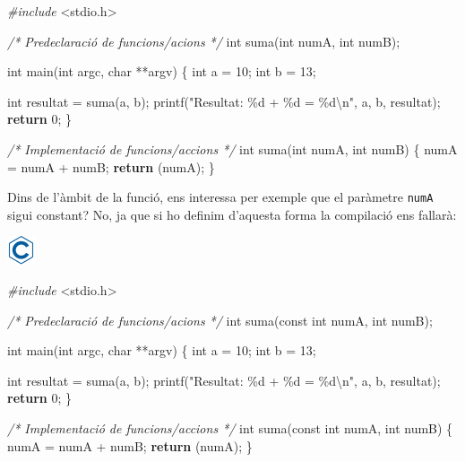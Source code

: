 \documentclass[]{book}
\newenvironment{Shaded}{\begin{snugshade}}{\end{snugshade}}
\newcommand{\CommentTok}[1]{\textcolor[rgb]{0.56,0.35,0.01}{\textit{#1}}}
\newcommand{\ControlFlowTok}[1]{\textcolor[rgb]{0.13,0.29,0.53}{\textbf{#1}}}
\newcommand{\DataTypeTok}[1]{\textcolor[rgb]{0.13,0.29,0.53}{#1}}
\newcommand{\DecValTok}[1]{\textcolor[rgb]{0.00,0.00,0.81}{#1}}
\newcommand{\ImportTok}[1]{#1}
\newcommand{\NormalTok}[1]{#1}
\newcommand{\PreprocessorTok}[1]{\textcolor[rgb]{0.56,0.35,0.01}{\textit{#1}}}
\newcommand{\SpecialCharTok}[1]{\textcolor[rgb]{0.00,0.00,0.00}{#1}}
\newcommand{\StringTok}[1]{\textcolor[rgb]{0.31,0.60,0.02}{#1}}
\begin{document}
\begin{Shaded}
\begin{Highlighting}[]
\PreprocessorTok{\#include }\ImportTok{\textless{}stdio.h\textgreater{}}

\CommentTok{/* Predeclaració de funcions/acions */}
\DataTypeTok{int}\NormalTok{ suma(}\DataTypeTok{int}\NormalTok{ numA, }\DataTypeTok{int}\NormalTok{ numB);}

\DataTypeTok{int}\NormalTok{ main(}\DataTypeTok{int}\NormalTok{ argc, }\DataTypeTok{char}\NormalTok{ **argv) \{}
    \DataTypeTok{int}\NormalTok{ a = }\DecValTok{10}\NormalTok{;}
    \DataTypeTok{int}\NormalTok{ b = }\DecValTok{13}\NormalTok{;}

    \DataTypeTok{int}\NormalTok{ resultat = suma(a, b);}
\NormalTok{    printf(}\StringTok{"Resultat: \%d + \%d = \%d}\SpecialCharTok{\textbackslash{}n}\StringTok{"}\NormalTok{, a, b, resultat);}
    \ControlFlowTok{return} \DecValTok{0}\NormalTok{;}
\NormalTok{\}}

\CommentTok{/* Implementació de funcions/accions */}
\DataTypeTok{int}\NormalTok{ suma(}\DataTypeTok{int}\NormalTok{ numA, }\DataTypeTok{int}\NormalTok{ numB) \{}
\NormalTok{    numA = numA + numB;}
    \ControlFlowTok{return}\NormalTok{ (numA);}
\NormalTok{\}}
\end{Highlighting}
\end{Shaded}

Dins de l'àmbit de la funció, ens interessa per exemple que el paràmetre \texttt{numA} sigui constant? No, ja que si ho definim d'aquesta forma la compilació ens fallarà:

\includegraphics{./img/c.png}

\begin{Shaded}
\begin{Highlighting}[]
\PreprocessorTok{\#include }\ImportTok{\textless{}stdio.h\textgreater{}}

\CommentTok{/* Predeclaració de funcions/acions */}
\DataTypeTok{int}\NormalTok{ suma(}\DataTypeTok{const} \DataTypeTok{int}\NormalTok{ numA, }\DataTypeTok{int}\NormalTok{ numB);}

\DataTypeTok{int}\NormalTok{ main(}\DataTypeTok{int}\NormalTok{ argc, }\DataTypeTok{char}\NormalTok{ **argv) \{}
    \DataTypeTok{int}\NormalTok{ a = }\DecValTok{10}\NormalTok{;}
    \DataTypeTok{int}\NormalTok{ b = }\DecValTok{13}\NormalTok{;}

    \DataTypeTok{int}\NormalTok{ resultat = suma(a, b);}
\NormalTok{    printf(}\StringTok{"Resultat: \%d + \%d = \%d}\SpecialCharTok{\textbackslash{}n}\StringTok{"}\NormalTok{, a, b, resultat);}
    \ControlFlowTok{return} \DecValTok{0}\NormalTok{;}
\NormalTok{\}}

\CommentTok{/* Implementació de funcions/accions */}
\DataTypeTok{int}\NormalTok{ suma(}\DataTypeTok{const} \DataTypeTok{int}\NormalTok{ numA, }\DataTypeTok{int}\NormalTok{ numB) \{}
\NormalTok{    numA = numA + numB;}
    \ControlFlowTok{return}\NormalTok{ (numA);}
\NormalTok{\}}
\end{Highlighting}
\end{Shaded}
\end{document}
